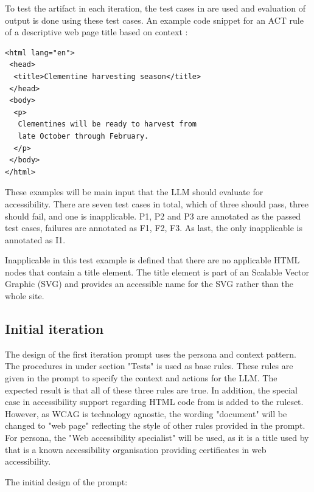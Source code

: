To test the artifact in each iteration, the test cases in \textcite{act_rule_g88} are used and evaluation of output is done using these test cases. An example code snippet for an ACT rule of a descriptive web page title based on context \citep{act_rule_g88}:

\begin{verbatim}
<html lang="en">
 <head>
  <title>Clementine harvesting season</title>
 </head>
 <body>
  <p>
   Clementines will be ready to harvest from 
   late October through February.
  </p>
 </body>
</html>
\end{verbatim}

These examples will be main input that the LLM should evaluate for accessibility. There are seven test cases in total, which of three should pass, three should fail, and one is inapplicable. P1, P2 and P3 are annotated as the passed test cases, failures are annotated as F1, F2, F3. As last, the only inapplicable is annotated as I1.

Inapplicable in this test example is defined that there are no applicable HTML nodes that contain a title element. The title element is part of an Scalable Vector Graphic (SVG) and provides an accessible name for the SVG rather than the whole site.

\subsection{Initial iteration}

The design of the first iteration prompt uses the persona and context pattern. The procedures in \textcite{g88} under section "Tests" is used as base rules. These rules are given in the prompt to specify the context and actions for the LLM. The expected result is that all of these three rules are true. In addition, the special case in accessibility support regarding HTML code from \textcite{act_rule_g88} is added to the ruleset. However, as WCAG is technology agnostic, the wording "document" will be changed to "web page" reflecting the style of other rules provided in the prompt. For persona, the "Web accessibility specialist" will be used, as it is a title used by \textcite{web_accessibility_specialist} that is a known accessibility organisation providing certificates in web accessibility.

The initial design of the prompt:

